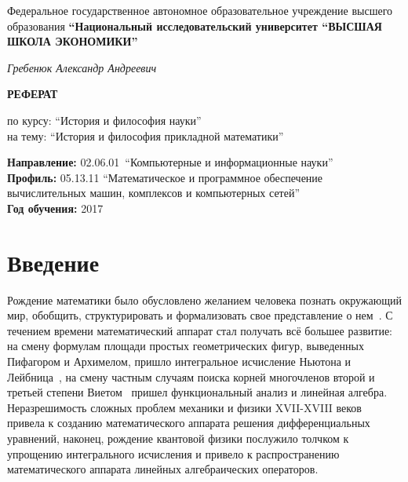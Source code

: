 


	\begin{titlepage}
		\centering
	    
	    \vfill
	    \large
	    Федеральное государственное автономное образовательное учреждение высшего образования \textbf{``Национальный исследовательский университет ``ВЫСШАЯ ШКОЛА ЭКОНОМИКИ''}
	    
	    \vspace{1cm}
	    \raggedleft
	    \textit{Гребенюк Александр Андреевич}
	    
	    \vfill
	    \centering
	    \huge
	    \textbf{РЕФЕРАТ}\\
	    \vspace{5mm}
	    
	    \large
	    по курсу: ``История и философия науки''\\
	    на тему: ``История и философия прикладной математики''\\[\bigskipamount]
	    
	    \vfill
	    \large
	    \raggedright
	    \textbf{Направление:} 02.06.01~``Компьютерные и информационные науки''\\
		\textbf{Профиль:} 05.13.11 ``Математическое и программное обеспечение вычислительных машин, комплексов и компьютерных сетей''\\
		\textbf{Год обучения:} 2017
	\end{titlepage}

\tableofcontents

\section{Введение}
Рождение математики было обусловлено желанием человека познать окружающий мир, обобщить, структурировать и формализовать свое представление о нем~\cite{rudn}. С течением времени математический аппарат стал получать всё большее развитие: на смену формулам площади простых геометрических фигур, выведенных Пифагором и Архимелом, пришло интегральное исчисление Ньютона и Лейбница~\cite{w:integral}, на смену частным случаям поиска корней многочленов второй и третьей степени Виетом~\cite{w:viete} пришел функциональный анализ и линейная алгебра. Неразрешимость сложных проблем механики и физики XVII-XVIII веков~\cite{rudn} привела к созданию математического аппарата решения дифференциальных уравнений, наконец, рождение квантовой физики послужило толчком к упрощению интегрального исчисления и привело к распространению математического аппарата линейных алгебраических операторов.


